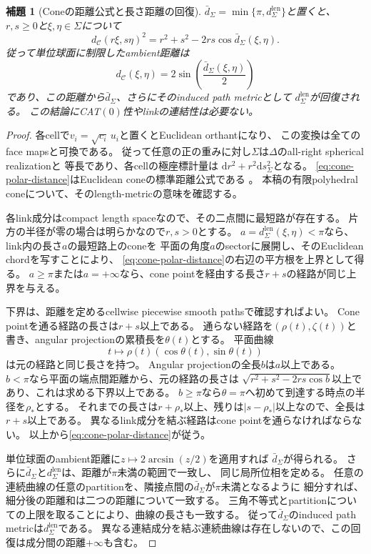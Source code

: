 \documentclass[11pt,a4paper]{ltjsarticle}
\newcommand{\dd}{\mathrm d}
\newcommand{\cC}{\mathcal C}
\theoremstyle{plain}
\newtheorem{lemma}[lemma]{補題}
\theoremstyle{definition}
\theoremstyle{remark}
\begin{document}
\begin{lemma}[Coneの距離公式と長さ距離の回復]
\label{lem:cone-link-metric}
$\bar d_\Sigma=\min\{\pi,d_\Sigma^{\mathrm{len}}\}$と置くと、
$r,s\ge0$と$\xi,\eta\in\Sigma$について
\begin{equation}
\label{eq:cone-polar-distance}
 d_\cC(r\xi,s\eta)^2
 =r^2+s^2-2rs\cos\bar d_\Sigma(\xi,\eta).
\end{equation}
従って単位球面に制限したambient距離は
\[
 d_\cC(\xi,\eta)
 =2\sin\!\left(\frac{\bar d_\Sigma(\xi,\eta)}2\right)
\]
であり、この距離から$\bar d_\Sigma$、さらにそのinduced path metricとして
$d_\Sigma^{\mathrm{len}}$が回復される。
この結論にCAT$(0)$性やlinkの連結性は必要ない。
\end{lemma}
\begin{proof}
各cellで$v_i=\sqrt{c_i}\,u_i$と置くとEuclidean orthantになり、
この変換は全てのface mapsと可換である。
従って任意の正の重みに対し$\Sigma$は$\Delta$のall-right spherical realizationと
等長であり、各cellの極座標計量は
$\dd r^2+r^2\dd s_\Sigma^2$となる。
\eqref{eq:cone-polar-distance}はEuclidean coneの標準距離公式である
\cite[Chapter~I, Definition~5.6 and Remarks~5.7, pp.~59--60]{BridsonHaefliger}。
本稿の有限polyhedral coneについて、そのlength-metricの意味を確認する。

各link成分はcompact length spaceなので、その二点間に最短路が存在する。
片方の半径が零の場合は明らかなので$r,s>0$とする。
$a=d_\Sigma^{\mathrm{len}}(\xi,\eta)<\pi$なら、link内の長さ$a$の最短路上のconeを
平面の角度$a$のsectorに展開し、そのEuclidean chordを写すことにより、
\eqref{eq:cone-polar-distance}の右辺の平方根を上界として得る。
$a\ge\pi$または$a=+\infty$なら、cone pointを経由する長さ$r+s$の経路が同じ上界を与える。

下界は、距離を定めるcellwise piecewise smooth pathsで確認すればよい。
Cone pointを通る経路の長さは$r+s$以上である。
通らない経路を$(\rho(t),\zeta(t))$と書き、angular projectionの累積長を$\theta(t)$とする。
平面曲線
\[
 t\longmapsto\rho(t)(\cos\theta(t),\sin\theta(t))
\]
は元の経路と同じ長さを持つ。
Angular projectionの全長$b$は$a$以上である。
$b<\pi$なら平面の端点間距離から、元の経路の長さは
$\sqrt{r^2+s^2-2rs\cos b}$以上であり、これは求める下界以上である。
$b\ge\pi$なら$\theta=\pi$へ初めて到達する時点の半径を$\rho_*$とする。
それまでの長さは$r+\rho_*$以上、残りは$|s-\rho_*|$以上なので、全長は$r+s$以上である。
異なるlink成分を結ぶ経路はcone pointを通らなければならない。
以上から\eqref{eq:cone-polar-distance}が従う。

単位球面のambient距離に$z\mapsto2\arcsin(z/2)$を適用すれば
$\bar d_\Sigma$が得られる。
さらに$\bar d_\Sigma$と$d_\Sigma^{\mathrm{len}}$は、距離が$\pi$未満の範囲で一致し、
同じ局所位相を定める。
任意の連続曲線の任意のpartitionを、隣接点間の$\bar d_\Sigma$が$\pi$未満となるように
細分すれば、細分後の距離和は二つの距離について一致する。
三角不等式とpartitionについての上限を取ることにより、曲線の長さも一致する。
従って$\bar d_\Sigma$のinduced path metricは$d_\Sigma^{\mathrm{len}}$である。
異なる連結成分を結ぶ連続曲線は存在しないので、この回復は成分間の距離$+\infty$も含む。
\end{proof}
\end{document}
